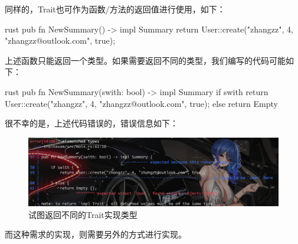 同样的，Trait也可作为函数/方法的返回值进行使用，如下：
\begin{code-block}{rust}
pub fn NewSummary() -> impl Summary {
    return User::create("zhangzz", 4, "zhangzz@outlook.com", true);
}
\end{code-block}
上述函数只能返回一个类型。如果需要返回不同的类型，我们编写的代码可能如下：
\begin{code-block}{rust}
pub fn NewSummary(swith: bool) -> impl Summary {
    if swith {
        return User::create("zhangzz", 4, "zhangzz@outlook.com", true);
    } else {
        return Empty{}
    }
}
\end{code-block}
很不幸的是，上述代码错误的，错误信息如下：
\begin{figure}[H]
  \centering
  \includegraphics[scale=0.3]{rust_trait_return.png}
  \caption{试图返回不同的Trait实现类型}
  \label{fig:rust_trait_return}
\end{figure}
而这种需求的实现，则需要另外的方式进行实现。

